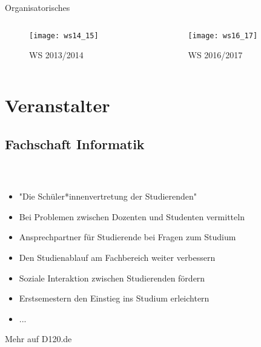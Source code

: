 

\usepackage{listings}
\usepackage{tikz}



\begin{titleframe}
	\begin{center}
		{\huge Organisatorisches}
	\end{center}
	\vspace{-5mm}
	\begin{columns}
		\begin{column}{6cm}
			\begin{figure}
				\centering
				\texttt{[image: ws14\_15]}
				\caption{WS 2013/2014}
			\end{figure}
		\end{column}
		\begin{column}{6cm}
			\begin{figure}
				\centering
				\texttt{[image: ws16\_17]}
				\caption{WS 2016/2017}
			\end{figure}
		\end{column}
	\end{columns}

\end{titleframe}



\section{Veranstalter}
\subsection*{Fachschaft Informatik}
\begin{frame}
	\frametitle{\insertsectionhead \\ {\small \insertsubsectionhead}}
	\begin{itemize}
		\item "Die Schüler*innenvertretung der Studierenden"
		\item Bei Problemen zwischen Dozenten und Studenten vermitteln
		\item Ansprechpartner für Studierende bei Fragen zum Studium
		\item Den Studienablauf am Fachbereich weiter verbessern
		\item Soziale Interaktion zwischen Studierenden fördern
		\item Erstsemestern den Einstieg ins Studium erleichtern
		\item ...
	\end{itemize}
\centering
\vspace{3mm}
\huge Mehr auf D120.de
\end{frame}

